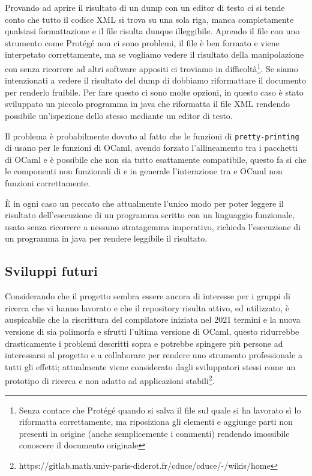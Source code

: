 Provando ad aprire il risultato di un dump con un editor di testo ci si tende conto che tutto il codice XML si trova su una sola riga, manca completamente qualsiasi formattazione e il file risulta dunque illeggibile. Aprendo il file con uno strumento come Protégé non ci sono problemi, il file è ben formato e viene interpetato correttamente, ma se vogliamo vedere il risultato della manipolazione con \cduce senza ricorrere ad altri software appositi ci troviamo in difficoltà\footnote{Senza contare che Protégé quando si salva il file sul quale si ha lavorato sì lo riformatta correttamente, ma riposiziona gli elementi e aggiunge parti non presenti in origine (anche semplicemente i commenti) rendendo imossibile conoscere il documento originale}. Se siamo intenzionati a vedere il risultato del dump di \cduce dobbiamo riformattare il documento per renderlo fruibile. Per fare questo ci sono molte opzioni, in questo caso è stato sviluppato un piccolo programma in java che riformatta il file XML rendendo possibile un'ispezione dello stesso mediante un editor di testo. 

Il problema è probabilmente dovuto al fatto che le funzioni di \verb|pretty-printing| di \cduce usano per le funzioni di OCaml, avendo forzato l'allineamento tra i pacchetti di OCaml e \cduce è possibile che non sia tutto esattamente compatibile, questo fa sì che le componenti non funzionali di \cduce e in generale l'interazione tra \cduce e OCaml non funzioni correttamente.

È in ogni caso un peccato che attualmente l'unico modo per poter leggere il risultato dell'esecuzione di un programma scritto con un linguaggio funzionale, usato senza ricorrere a nessuno stratagemma imperativo, richieda l'esecuzione di un programma in java per rendere leggibile il risultato.
\subsection{Sviluppi futuri}
Considerando che il progetto sembra essere ancora di interesse per i gruppi di ricerca che vi hanno lavorato e che il repository risulta attivo, ed utilizzato, è auspicabile che la riscrittura del compilatore iniziata nel 2021 termini e la nuova versione di \cduce sia polimorfa e sfrutti l'ultima versione di OCaml, questo ridurrebbe drasticamente i problemi descritti sopra e potrebbe spingere più persone ad interessarsi al progetto e a collaborare per rendere \cduce uno strumento professionale a tutti gli effetti; attualmente \cduce viene considerato dagli sviluppatori stessi come un prototipo di ricerca e non adatto ad applicazioni stabili\footnote{https://gitlab.math.univ-paris-diderot.fr/cduce/cduce/-/wikis/home}.
